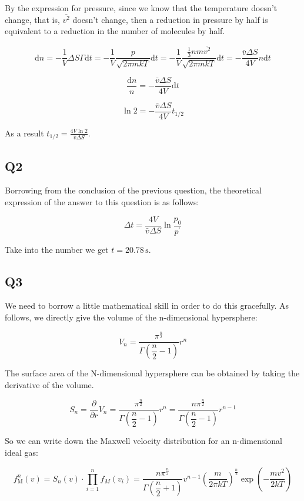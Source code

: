 \documentclass[a4paper,11pt]{amsart}
\theoremstyle{definition}
\begin{document}
	By the expression for pressure, since we know that the temperature doesn't change, that is, $\overline{v^2}$ doesn't change, then a reduction in pressure by half is equivalent to a reduction in the number of molecules by half.

	$$
	\mathrm{d}n=-\frac{1}{V}\Delta S\varGamma \mathrm{d}t=-\frac{1}{V}\frac{p}{\sqrt{2\pi mkT}}\mathrm{d}t=-\frac{1}{V}\frac{\frac{1}{3}nm\overline{v^2}}{\sqrt{2\pi mkT}}\mathrm{d}t=-\frac{\bar{v}\Delta S}{4V}n\mathrm{d}t
	$$

	$$
	\frac{\mathrm{d}n}{n}=-\frac{\bar{v}\Delta S}{4V}\mathrm{d}t
	$$

	$$
	\ln 2=-\frac{\bar{v}\Delta S}{4V}t_{1/2}
	$$

	As a result $\displaystyle t_{1/2}=\frac{4V\ln 2}{\bar{v}\Delta S}$.

	\subsection*{Q2}

	Borrowing from the conclusion of the previous question, the theoretical expression of the answer to this question is as follows:

	$$
	\Delta t=\frac{4V}{\bar{v}\Delta S}\ln \frac{p_0}{p^{\prime}}
	$$

	Take into the number we get $t=20.78\,\mathrm{s}$.

	\subsection*{Q3}

	We need to borrow a little mathematical skill in order to do this gracefully. As follows, we directly give the volume of the n-dimensional hypersphere:

	$$
	V_n=\frac{\pi ^{\tfrac{n}{2}}}{\Gamma \left( \dfrac{n}{2}-1 \right)}r^n
	$$

	The surface area of the N-dimensional hypersphere can be obtained by taking the derivative of the volume.

	$$
	S_n=\frac{\partial}{\partial r}V_n=\frac{\pi ^{\tfrac{n}{2}}}{\Gamma \left( \dfrac{n}{2}-1 \right)}r^n=\frac{n\pi ^{\tfrac{n}{2}}}{\Gamma \left( \dfrac{n}{2}-1 \right)}r^{n-1}
	$$

	So we can write down the Maxwell velocity distribution for an n-dimensional ideal gas:

	$$
	f_{\mathrm{M}}^{n}\left( v \right) =S_n\left( v \right) \cdot \prod_{i=1}^n{f_M\left( v_i \right)}=\frac{n\pi ^{\tfrac{n}{2}}}{\Gamma \left( \dfrac{n}{2}+1 \right)}v^{n-1}\left( \frac{m}{2\pi kT} \right) ^{\tfrac{n}{2}}\exp \left( -\frac{mv^2}{2kT} \right) 
	$$
\end{document}
